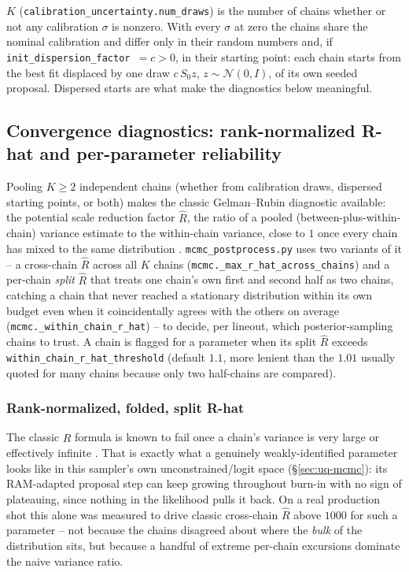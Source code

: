 \documentclass[11pt]{article}
\newcommand{\code}[1]{\texttt{#1}}
\begin{document}
$K$ (\code{calibration\_uncertainty.num\_draws}) is the number of chains whether or not any
calibration $\sigma$ is nonzero. With every $\sigma$ at zero the chains share the nominal
calibration and differ only in their random numbers and, if
\code{init\_dispersion\_factor}~$=c>0$, in their starting point: each chain starts from the
best fit displaced by one draw $c\,S_0z$, $z\sim\mathcal N(0,I)$, of its own seeded
proposal. Dispersed starts are what make the diagnostics below meaningful.

\subsection{Convergence diagnostics: rank-normalized R-hat and per-parameter
reliability}\label{sec:uq-mcmc-rhat}

Pooling $K\ge2$ independent chains (whether from calibration draws, dispersed starting
points, or both) makes the classic Gelman--Rubin diagnostic available: the potential scale
reduction factor $\hat R$, the ratio of a pooled (between-plus-within-chain) variance
estimate to the within-chain variance, close to $1$ once every chain has mixed to the same
distribution \cite{gelmanrubin1992}. \code{mcmc\_postprocess.py} uses two variants of it --
a cross-chain $\hat R$ across all $K$ chains (\code{mcmc.\_max\_r\_hat\_across\_chains}) and
a per-chain \emph{split} $\hat R$ that treats one chain's own first and second half as two
chains, catching a chain that never reached a stationary distribution within its own budget
even when it coincidentally agrees with the others on average
(\code{mcmc.\_within\_chain\_r\_hat}) -- to decide, per lineout, which posterior-sampling
chains to trust. A chain is flagged for a parameter when its split $\hat R$ exceeds
\code{within\_chain\_r\_hat\_threshold} (default $1.1$, more lenient than the $1.01$ usually
quoted for many chains because only two half-chains are compared).

\subsubsection{Rank-normalized, folded, split R-hat}

The classic $\hat R$ formula is known to fail once a chain's variance is very large or
effectively infinite \cite{vehtari2021}. That is exactly what a genuinely
weakly-identified parameter looks like in this sampler's own unconstrained/logit space
(\S\ref{sec:uq-mcmc}): its RAM-adapted proposal step can keep growing throughout burn-in
with no sign of plateauing, since nothing in the likelihood pulls it back. On a real
production shot this alone was measured to drive classic cross-chain $\hat R$ above
$1000$ for such a parameter -- not because the chains disagreed about where the
\emph{bulk} of the distribution sits, but because a handful of extreme per-chain
excursions dominate the naive variance ratio.
\end{document}
